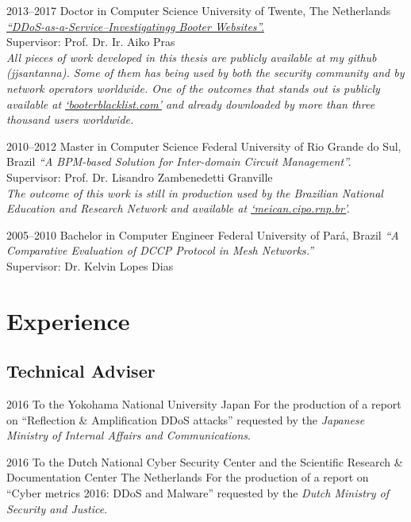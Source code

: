 \documentclass[print]{styles/friggeri-cv-mac} %
\begin{document}
\begin{entrylist}

\entry
{2013--2017}
{Doctor {\normalfont in Computer Science}}
{University of Twente, The Netherlands}
{\emph{\href{https://research.utwente.nl/files/18494043/jjsantanna_thesis.pdf}{``DDoS-as-a-Service--Investigatingg Booter Websites''.}} \\
Supervisor: Prof. Dr. Ir. Aiko Pras\\	
\textit{All pieces of work developed in this thesis are publicly available at my github (jjsantanna). Some of them has being used by both the security community and by network operators worldwide. One of the outcomes that stands out is publicly available at \href{http://booterblacklist.com}{`booterblacklist.com'} and already downloaded by more than three thousand users worldwide.}}

\entry
{2010--2012}
{Master {\normalfont in Computer Science}}
{Federal University of Rio Grande do Sul, Brazil}
{\emph{``A BPM-based Solution for Inter-domain Circuit Management''.}\\
Supervisor: Prof. Dr. Lisandro Zambenedetti Granville\\
\textit{The outcome of this work is still in production used by the Brazilian
National Education and Research Network and available at
\href{http://meican.cipo.rnp.br/}{`meican.cipo.rnp.br'}.}}

\entry
{2005--2010}
{Bachelor {\normalfont in Computer Engineer}}
{Federal University of Par\'a, Brazil}
{\emph{``A Comparative Evaluation of DCCP Protocol in Mesh Networks.''} \\ 
Supervisor: Dr. Kelvin Lopes Dias
}

\end{entrylist}

\section{Experience}\vspace{-5pt}
\subsection{Technical Adviser}\vspace{-5pt}
\begin{entrylist}
\entry
{2016}
{To the Yokohama National University}
{Japan}
{For the production of a report on ``Reflection \& Amplification DDoS attacks''
requested by the \emph{Japanese Ministry of Internal Affairs and
Communications}.}

\entry
{2016}
{To the Dutch National Cyber Security Center and the Scientific Research \& Documentation Center}
{The Netherlands}
{For the production of a report on ``Cyber metrics 2016: DDoS and Malware''
requested by the \emph{Dutch Ministry of Security and Justice}.} \end{entrylist}
\end{document}
